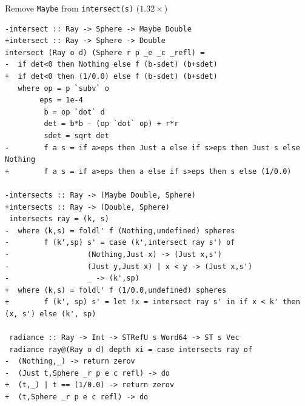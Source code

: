 \documentclass[8pt]{beamer}
\begin{document}
\begin{frame}[fragile]{Remove \texttt{Maybe} from \texttt{intersect(s)} ($1.32\times$)}
\begin{verbatim}
-intersect :: Ray -> Sphere -> Maybe Double
+intersect :: Ray -> Sphere -> Double
intersect (Ray o d) (Sphere r p _e _c _refl) =
-  if det<0 then Nothing else f (b-sdet) (b+sdet)
+  if det<0 then (1/0.0) else f (b-sdet) (b+sdet)
   where op = p `subv` o
        eps = 1e-4
         b = op `dot` d
         det = b*b - (op `dot` op) + r*r
         sdet = sqrt det
-        f a s = if a>eps then Just a else if s>eps then Just s else Nothing
+        f a s = if a>eps then a else if s>eps then s else (1/0.0)

-intersects :: Ray -> (Maybe Double, Sphere)
+intersects :: Ray -> (Double, Sphere)
 intersects ray = (k, s)
-  where (k,s) = foldl' f (Nothing,undefined) spheres
-        f (k',sp) s' = case (k',intersect ray s') of
-                  (Nothing,Just x) -> (Just x,s')
-                  (Just y,Just x) | x < y -> (Just x,s')
-                  _ -> (k',sp)
+  where (k,s) = foldl' f (1/0.0,undefined) spheres
+        f (k', sp) s' = let !x = intersect ray s' in if x < k' then (x, s') else (k', sp)
 
 radiance :: Ray -> Int -> STRefU s Word64 -> ST s Vec
 radiance ray@(Ray o d) depth xi = case intersects ray of
-  (Nothing,_) -> return zerov
-  (Just t,Sphere _r p e c refl) -> do
+  (t,_) | t == (1/0.0) -> return zerov
+  (t,Sphere _r p e c refl) -> do
\end{verbatim}
\end{frame}

\end{document}

